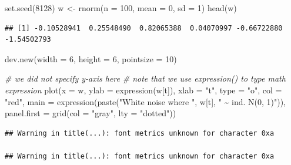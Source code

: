 \documentclass[
]{book}
\newenvironment{Shaded}{\begin{snugshade}}{\end{snugshade}}
\newcommand{\AttributeTok}[1]{\textcolor[rgb]{0.77,0.63,0.00}{#1}}
\newcommand{\CommentTok}[1]{\textcolor[rgb]{0.56,0.35,0.01}{\textit{#1}}}
\newcommand{\DecValTok}[1]{\textcolor[rgb]{0.00,0.00,0.81}{#1}}
\newcommand{\FunctionTok}[1]{\textcolor[rgb]{0.00,0.00,0.00}{#1}}
\newcommand{\NormalTok}[1]{#1}
\newcommand{\OtherTok}[1]{\textcolor[rgb]{0.56,0.35,0.01}{#1}}
\newcommand{\StringTok}[1]{\textcolor[rgb]{0.31,0.60,0.02}{#1}}
\theoremstyle{definition}
\theoremstyle{definition}
\theoremstyle{definition}
\theoremstyle{definition}
\theoremstyle{remark}
\begin{document}
\begin{Shaded}
\begin{Highlighting}[]
\FunctionTok{set.seed}\NormalTok{(}\DecValTok{8128}\NormalTok{)}
\NormalTok{w }\OtherTok{\textless{}{-}} \FunctionTok{rnorm}\NormalTok{(}\AttributeTok{n =} \DecValTok{100}\NormalTok{, }\AttributeTok{mean =} \DecValTok{0}\NormalTok{, }\AttributeTok{sd =} \DecValTok{1}\NormalTok{)}
\FunctionTok{head}\NormalTok{(w)}
\end{Highlighting}
\end{Shaded}

\begin{verbatim}
## [1] -0.10528941  0.25548490  0.82065388  0.04070997 -0.66722880 -1.54502793
\end{verbatim}

\begin{Shaded}
\begin{Highlighting}[]
\FunctionTok{dev.new}\NormalTok{(}\AttributeTok{width =} \DecValTok{6}\NormalTok{, }\AttributeTok{height =} \DecValTok{6}\NormalTok{, }\AttributeTok{pointsize =} \DecValTok{10}\NormalTok{)}

\CommentTok{\# we did not specify y{-}axis here}
\CommentTok{\# note that we use expression() to type math expression}
\FunctionTok{plot}\NormalTok{(}\AttributeTok{x =}\NormalTok{ w, }\AttributeTok{ylab =} \FunctionTok{expression}\NormalTok{(w[t]), }\AttributeTok{xlab =} \StringTok{"t"}\NormalTok{, type }
    \OtherTok{=} \StringTok{"o"}\NormalTok{, }\AttributeTok{col =} \StringTok{"red"}\NormalTok{, }\AttributeTok{main =} \FunctionTok{expression}\NormalTok{(}\FunctionTok{paste}\NormalTok{(}\StringTok{"White }
\StringTok{    noise where "}\NormalTok{, w[t], }\StringTok{" \textasciitilde{} ind. N(0, 1)"}\NormalTok{)), }
    \AttributeTok{panel.first =} \FunctionTok{grid}\NormalTok{(}\AttributeTok{col =} \StringTok{"gray"}\NormalTok{, }\AttributeTok{lty =} \StringTok{"dotted"}\NormalTok{))}
\end{Highlighting}
\end{Shaded}

\begin{verbatim}
## Warning in title(...): font metrics unknown for character 0xa

## Warning in title(...): font metrics unknown for character 0xa
\end{verbatim}
\end{document}
